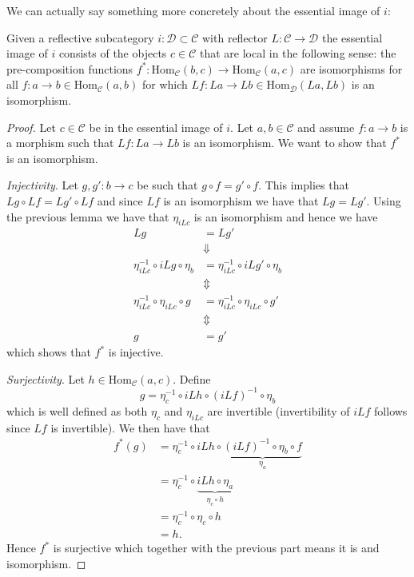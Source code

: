 We can actually say something more concretely about the essential image of $ i $:
\begin{proposition}
  \label{prop:local}
  Given a reflective subcategory $ i: \mathcal{D} \subset \mathcal{C} $ with reflector $ L: \mathcal{C} \to \mathcal{D} $ the essential image of $ i $ consists of the objects $ c \in \mathcal{C} $ that are local in the following sense: the pre-composition functions $ f^{*}:\text{Hom}_{\mathcal{C}}(b, c) \to \text{Hom}_{\mathcal{C}}(a, c) $ are isomorphisms for all $ f: a \to b \in \text{Hom}_{\mathcal{C}}(a, b) $ for which $ Lf: La \to Lb \in \text{Hom}_{\mathcal{D}}(La, Lb) $ is an isomorphism.
\end{proposition}
\begin{proof}
  Let $ c \in \mathcal{C} $ be in the essential image of $ i $. Let $ a,b \in \mathcal{C} $ and assume $ f: a \to b $ is a morphism such that $ Lf: La \to Lb $ is an isomorphism. We want to show that $ f^{*} $ is an isomorphism.

  \textit{Injectivity}. Let $ g,g': b \to c $ be such that $ g\circ f = g'\circ f $. This implies that $ Lg \circ Lf = Lg' \circ Lf $ and since $ Lf $ is an isomorphism we have that $ Lg = Lg' $. Using the previous lemma we have that $ \eta_{iLc} $ is an isomorphism and hence we have
  \begin{align*}
    Lg &= Lg' \\
       &\Downarrow \\
    \eta^{-1}_{iLc}\circ iLg \circ \eta_b &= \eta^{-1}_{iLc} \circ iLg' \circ \eta_b \\
                                     &\Updownarrow \\
    \eta^{-1}_{iLc} \circ \eta_{iLc} \circ g &= \eta^{-1}_{iLc} \circ \eta_{iLc} \circ g' \\
                                             &\Updownarrow \\
    g &= g'
  \end{align*}
  which shows that $ f^{*} $ is injective.

  \textit{Surjectivity}. Let $ h \in \text{Hom}_{\mathcal{C}}(a, c) $. Define
  \begin{equation}
    g = \eta^{-1}_c \circ iLh \circ (iLf)^{-1} \circ \eta_b
  \end{equation}
  which is well defined as both $ \eta_c $ and $ \eta_{iLc} $ are invertible (invertibility of $ iLf $ follows since $ Lf $ is invertible). We then have that
  \begin{align*}
    f^*(g) &= \eta^{-1}_c \circ iLh \circ \underbrace{(iLf)^{-1} \circ \eta_b \circ f}_{\eta_a} \\
           &= \eta^{-1}_c \circ \underbrace{iLh \circ \eta_a}_{\eta_{c} \circ h} \\
           &= \eta^{-1}_c \circ \eta_c \circ h \\
           &= h
  .\end{align*}
  Hence $ f^{*} $ is surjective which together with the previous part means it is and isomorphism.


\end{proof}
